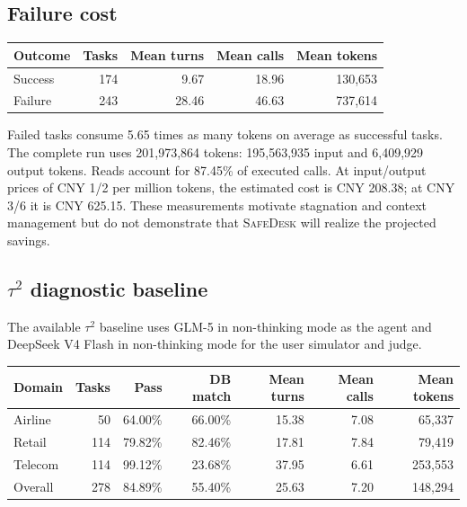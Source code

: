 \documentclass[10pt]{article}
\newcommand{\safedesk}{\textsc{SafeDesk}}
\begin{document}
\subsection{Failure cost}

\begin{center}
\begin{minipage}{0.70\linewidth}
\centering
{}
\label{tab:efficiency}
\small
\begin{tabular}{@{}lrrrr@{}}
\toprule
Outcome & Tasks & Mean turns & Mean calls & Mean tokens \\
\midrule
Success & 174 & 9.67 & 18.96 & 130,653 \\
Failure & 243 & 28.46 & 46.63 & 737,614 \\
\bottomrule
\end{tabular}
\end{minipage}
\end{center}

Failed tasks consume 5.65 times as many tokens on average as successful tasks.
The complete run uses 201,973,864 tokens: 195,563,935 input and 6,409,929
output tokens. Reads account for 87.45\% of executed calls. At input/output prices
of CNY 1/2 per million tokens, the estimated cost is CNY 208.38; at CNY 3/6 it
is CNY 625.15. These measurements motivate stagnation and context management but
do not demonstrate that \safedesk{} will realize the projected savings.

\subsection{\texorpdfstring{$\tau^2$}{tau2} diagnostic baseline}

The available $\tau^2$ baseline uses GLM-5 in non-thinking mode as the agent and
DeepSeek V4 Flash in non-thinking mode for the user simulator and judge.

\begin{center}
\begin{minipage}{0.90\linewidth}
\centering
{}
\label{tab:tau2}
\small
\begin{tabular}{@{}lrrrrrr@{}}
\toprule
Domain & Tasks & Pass & DB match & Mean turns & Mean calls & Mean tokens \\
\midrule
Airline & 50 & 64.00\% & 66.00\% & 15.38 & 7.08 & 65,337 \\
Retail & 114 & 79.82\% & 82.46\% & 17.81 & 7.84 & 79,419 \\
Telecom & 114 & 99.12\% & 23.68\% & 37.95 & 6.61 & 253,553 \\
\midrule
Overall & 278 & 84.89\% & 55.40\% & 25.63 & 7.20 & 148,294 \\
\bottomrule
\end{tabular}
\end{minipage}
\end{center}
\end{document}

